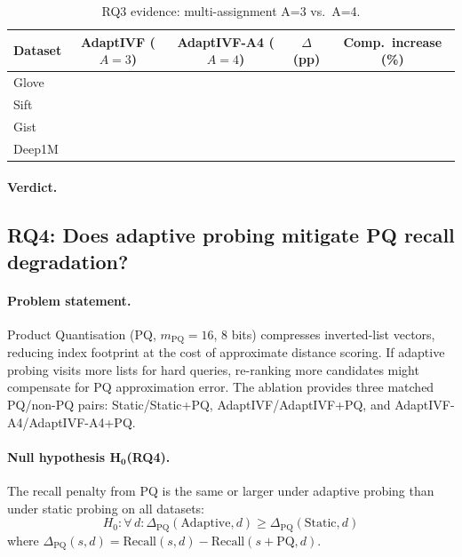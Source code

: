 \begin{table}[h]
\centering
\caption{RQ3 evidence: multi-assignment A=3 vs.\ A=4.}
\label{tab:appendix:rq3}
\begin{tabular}{lcccc}
\toprule
Dataset & AdaptIVF ($A\!=\!3$) & AdaptIVF-A4 ($A\!=\!4$) & $\Delta$ (pp) & Comp.\ increase (\%) \\
\midrule
Glove  & \placeholder{\_\_\_} & \placeholder{\_\_\_} & \placeholder{\_\_\_} & \placeholder{\_\_\_} \\
Sift   & \placeholder{\_\_\_} & \placeholder{\_\_\_} & \placeholder{\_\_\_} & \placeholder{\_\_\_} \\
Gist   & \placeholder{\_\_\_} & \placeholder{\_\_\_} & \placeholder{\_\_\_} & \placeholder{\_\_\_} \\
Deep1M & \placeholder{\_\_\_} & \placeholder{\_\_\_} & \placeholder{\_\_\_} & \placeholder{\_\_\_} \\
\bottomrule
\end{tabular}
\end{table}

\paragraph{Verdict.}

\subsection{RQ4: Does adaptive probing mitigate PQ recall degradation?}
\label{sec:appendix:rq4}

\paragraph{Problem statement.}
Product Quantisation (PQ, $m_{\text{PQ}}\!=\!16$, 8 bits) compresses
inverted-list vectors, reducing index footprint at the cost of approximate
distance scoring.  If adaptive probing visits more lists for hard queries,
re-ranking more candidates might compensate for PQ approximation error.  The
ablation provides three matched PQ/non-PQ pairs: Static/Static+PQ,
AdaptIVF/AdaptIVF+PQ, and AdaptIVF-A4/AdaptIVF-A4+PQ.

\paragraph{Null hypothesis $\boldsymbol{H_0}$(RQ4).}
The recall penalty from PQ is the same or larger under adaptive probing than
under static probing on all datasets:
\[
  H_0: \forall\, d : \Delta_{\text{PQ}}(\text{Adaptive}, d) \geq \Delta_{\text{PQ}}(\text{Static}, d)
\]
where $\Delta_{\text{PQ}}(s, d) = \text{Recall}(s, d) - \text{Recall}(s{+}\text{PQ}, d)$.

